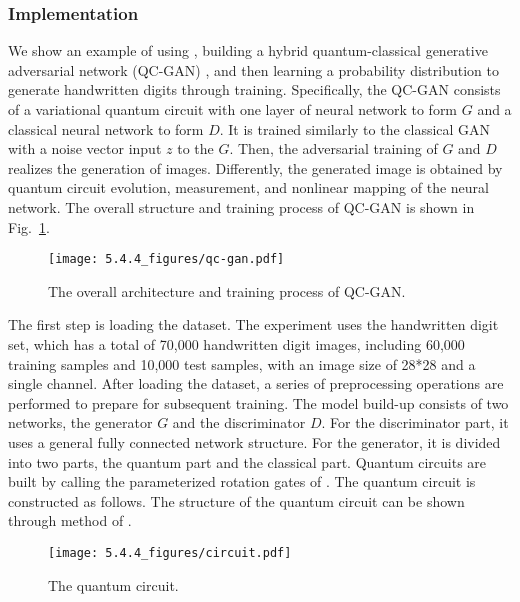 \subsubsection{Implementation}
We show an example of using \MindQuantum, building a hybrid quantum-classical generative adversarial network (QC-GAN) \cite{shu2024variational}, and then learning a probability distribution to generate handwritten digits through training. Specifically, the QC-GAN consists of a variational quantum circuit with one layer of neural network to form ${G}$ and a classical neural network to form ${D}$. It is trained similarly to the classical GAN with a noise vector input ${z}$ to the ${G}$. Then, the adversarial training of ${G}$ and ${D}$ realizes the generation of images.
Differently, the generated image is obtained by quantum circuit evolution, measurement, and nonlinear mapping of the neural network. The overall structure and training process of QC-GAN is shown in Fig.~\ref{qc-gan}.

\begin{figure}[ht]
  \centering
  \texttt{[image: 5.4.4\_figures/qc-gan.pdf]}
  \caption{\label{qc-gan} The overall architecture and training process of QC-GAN.}
\end{figure}

The first step is loading the dataset. The experiment uses the handwritten digit set, which has a total of 70,000 handwritten digit images, including 60,000 training samples and 10,000 test samples, with an image size of 28*28 and a single channel. After loading the dataset, a series of preprocessing operations are performed to prepare for subsequent training. The model build-up consists of two networks, the generator ${G}$ and the discriminator ${D}$. For the discriminator part, it uses a general fully connected network structure. For the generator, it is divided into two parts, the quantum part and the classical part. Quantum circuits are built by calling the parameterized rotation gates of \MindQuantum. The quantum circuit is constructed as follows. The structure of the quantum circuit can be shown through \methodsummary method of \Circuit.
\begin{figure*}[htbp]
  \centering
  \texttt{[image: 5.4.4\_figures/circuit.pdf]}
  \caption{\label{quantum-circuit} The quantum circuit.}
\end{figure*}

